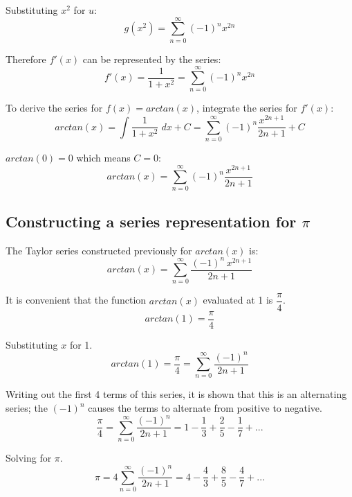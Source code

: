 \documentclass[12pt, titlepage]{article}
\begin{document}
Substituting \(x^{2}\) for \(u\): 
\begin{equation*}
    g(x^{2}) = \sum_{n=0}^{\infty} (-1)^{n}x^{2n}
\end{equation*}

Therefore \(f'(x)\) can be represented by the series:
\begin{equation*}
f'(x) = \frac{1}{1 + x^{2}} = \sum_{n=0}^{\infty} (-1)^{n}x^{2n}
\end{equation*}

To derive the series for \(f(x) = arctan(x)\), integrate the series for \(f'(x)\):
\begin{equation*}
    arctan(x) = \int \frac{1}{1+x^{2}} \; dx + C = \sum_{n=0}^{\infty} (-1)^{n}\frac{x^{2n+1}}{2n+1} + C
\end{equation*}

\(arctan(0) = 0\) which means \(C = 0\):
\begin{equation*}
    arctan(x) = \sum_{n=0}^{\infty} (-1)^{n}\frac{x^{2n+1}}{2n+1} 
\end{equation*}

\subsection{Constructing a series representation for \(\pi\)}
The Taylor series constructed previously for \(arctan(x)\) is:
\begin{equation*}
	arctan(x) = \sum^{\infty}_{n=0} \frac{(-1)^{n}\,x^{2n+1}}{2n+1}
\end{equation*}

It is convenient that the function \(arctan(x)\) evaluated at 1 is \(\dfrac{\pi}{4}\).
\begin{equation*}
    arctan(1) = \frac{\pi}{4}
\end{equation*}

Substituting \(x\) for 1.
\begin{equation*}
    arctan(1) = \frac{\pi}{4} = \sum_{n=0}^\infty{ \frac{(-1)^n}{2n+1}}
\end{equation*}

Writing out the first 4 terms of this series, it is shown that this is an alternating series; the \((-1)^{n}\) causes the terms to alternate from positive to negative.
\begin{equation*}
    \frac{\pi}{4} =\sum_{n=0}^\infty{ \frac{(-1)^n}{2n+1} = 1 - \frac{1}{3} + \frac{2}{5} - \frac{1}{7} + ... }
\end{equation*}

Solving for \(\pi\).
\begin{equation*}
    \pi = 4 \sum_{n=0}^\infty{ \frac{(-1)^n}{2n+1} = 4 - \frac{4}{3} + \frac{8}{5} - \frac{4}{7} + ... }
\end{equation*}
\end{document}
